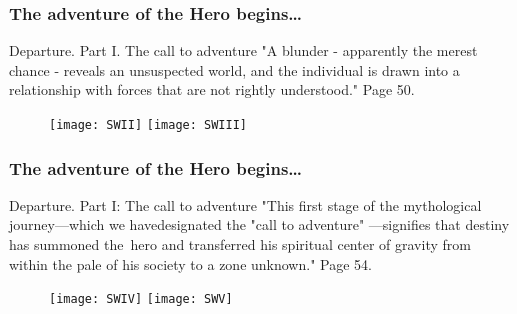 \documentclass[10pt,t]{beamer}
\begin{document}
\begin{frame}
  \frametitle{The adventure of the Hero begins\ldots}

  \begin{block}{Departure. Part I. The call to adventure}
    "A blunder - apparently the merest chance - reveals an unsuspected
    world, and the individual is drawn into a relationship with forces
    that are not rightly understood." Page 50.
  \end{block}

  \begin{block}{}
    \begin{figure}
      \centering

      \texttt{[image: SWII]}
      \texttt{[image: SWIII]}
    \end{figure}
  \end{block}

\end{frame}



\begin{frame}
  \frametitle{The adventure of the Hero begins\ldots}

  \begin{block}{Departure. Part I: The call to adventure}
    "This first stage of the mythological journey—which we
    havedesignated the "call to adventure" —signifies that destiny has
    summoned the~hero and transferred his spiritual center of gravity
    from within the pale of his society to a zone unknown." Page 54.
  \end{block}

  \begin{block}{}
    \begin{figure}
      \centering

      \texttt{[image: SWIV]}
      \texttt{[image: SWV]}
    \end{figure}
  \end{block}

\end{frame}
\end{document}
